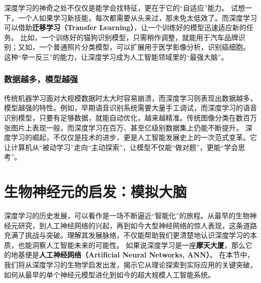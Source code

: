 
深度学习的神奇之处不仅仅是能学会找特征，更在于它的“自适应”能力。
试想一下，一个人如果学习新技能，每次都需要从头来过，那未免太低效了。而深度学习可以借助\textbf{迁移学习（Transfer Learning）}，让一个训练好的模型迅速适应新的任务。
比如，一个训练好的猫狗识别模型，只需稍作调整，就能用于汽车品牌识别；又如，一个普通照片分类模型，可以扩展用于医学影像分析，识别癌细胞。
这种“举一反三”的能力，让深度学习成为人工智能领域里的“最强大脑”。
\subsubsection{ 数据越多，模型越强}


传统机器学习面对大规模数据时太大时容易崩溃，而深度学习则表现出数据越多，模型越强的特性。例如，早期语音识别系统需要大量手工调试，而深度学习的语音识别模型，只要有足够数据，就能自动优化，越来越精准。传统图像分类在数百万张图片上表现一般，而深度学习在百万、甚至亿级别数据集上仍能不断提升。
深度学习的崛起，不仅仅是技术的进步，更是人工智能发展史上的一次范式变革。它让计算机从“被动学习”走向“主动探索”，让模型不仅能“做对题”，更能“学会思考”。
\section{生物神经元的启发：模拟大脑}


深度学习的历史发展，可以看作是一场不断逼近“智能化”的旅程。从最早的生物神经元研究，到人工神经网络的兴起，再到如今大型神经网络的惊人表现，这条道路充满了挑战与突破。理解其发展脉络，不仅能帮助我们更清楚地认识深度学习的本质，也能洞察人工智能未来的可能性。
如果说深度学习是一座{\bf 摩天大厦}，那么它的地基便是{\bf 人工神经网络（Artificial Neural Networks, ANN）}。
在本节中，我们将从深度学习的生物学启发出发，揭示它从理论探索到实际应用的关键突破，如何从最早的单个神经元模型进化到如今的超大规模人工智能系统。
